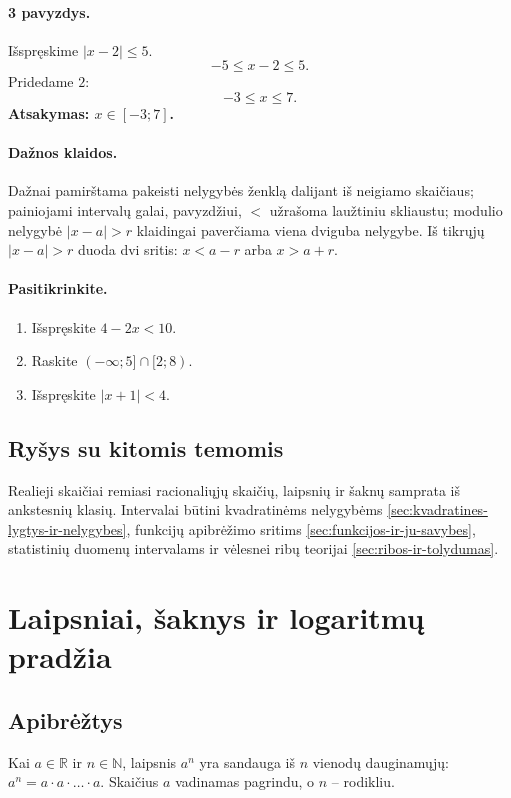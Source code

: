 \paragraph{3 pavyzdys.}
Išspręskime $|x-2|\le 5$.
\[
-5\le x-2\le 5.
\]
Pridedame $2$:
\[
-3\le x\le 7.
\]
\textbf{Atsakymas: $x\in[-3;7]$.}

\paragraph{Dažnos klaidos.}
Dažnai pamirštama pakeisti nelygybės ženklą dalijant iš neigiamo skaičiaus; painiojami intervalų galai, pavyzdžiui, $<$ užrašoma laužtiniu skliaustu; modulio nelygybė $|x-a|>r$ klaidingai paverčiama viena dviguba nelygybe. Iš tikrųjų $|x-a|>r$ duoda dvi sritis: $x<a-r$ arba $x>a+r$.

\paragraph{Pasitikrinkite.}
\begin{enumerate}
\item Išspręskite $4-2x<10$.
\item Raskite $(-\infty;5]\cap[2;8)$.
\item Išspręskite $|x+1|<4$.
\end{enumerate}

\subsection{Ryšys su kitomis temomis}

Realieji skaičiai remiasi racionaliųjų skaičių, laipsnių ir šaknų samprata iš ankstesnių klasių. Intervalai būtini kvadratinėms nelygybėms \ref{sec:kvadratines-lygtys-ir-nelygybes}, funkcijų apibrėžimo sritims \ref{sec:funkcijos-ir-ju-savybes}, statistinių duomenų intervalams ir vėlesnei ribų teorijai \ref{sec:ribos-ir-tolydumas}.

\section{Laipsniai, šaknys ir logaritmų pradžia}\label{sec:laipsniai-saknys-ir-logaritmu-pradzia}

\subsection{Apibrėžtys}

\begin{apibreztis}
Kai $a\in\mathbb{R}$ ir $n\in\mathbb{N}$, laipsnis $a^n$ yra sandauga iš $n$ vienodų dauginamųjų: $a^n=a\cdot a\cdot\ldots\cdot a$. Skaičius $a$ vadinamas pagrindu, o $n$ -- rodikliu.
\end{apibreztis}

